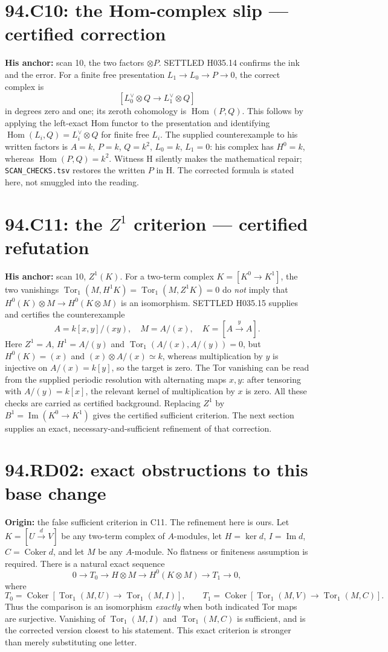 \documentclass[11pt]{article}
\newcommand{\Hom}{\operatorname{Hom}}
\newcommand{\Tor}{\operatorname{Tor}}
\newcommand{\im}{\operatorname{Im}}
\newcommand{\coker}{\operatorname{Coker}}
\begin{document}
\section{94.C10: the Hom-complex slip --- certified correction}
\label{C10}
\textbf{His anchor:} scan 10, the two factors \emph{$\otimes P$}.
SETTLED H035.14 confirms the ink and the error. For a finite free
presentation $L_1\to L_0\to P\to0$, the correct complex is
\[
 [L_0^\vee\otimes Q\longrightarrow L_1^\vee\otimes Q]
\]
in degrees zero and one; its zeroth cohomology is $\Hom(P,Q)$.
This follows by applying the left-exact Hom functor to the presentation
and identifying $\Hom(L_i,Q)=L_i^\vee\otimes Q$ for finite free $L_i$.
The supplied counterexample to his written factors is $A=k$, $P=k$,
$Q=k^2$, $L_0=k$, $L_1=0$: his complex has $H^0=k$, whereas
$\Hom(P,Q)=k^2$. Witness H silently makes the mathematical repair;
\texttt{SCAN\_CHECKS.tsv} restores the written $P$ in H. The corrected formula is
stated here, not smuggled into the reading.

\section{94.C11: the $Z^1$ criterion --- certified refutation}
\label{C11}
\textbf{His anchor:} scan 10, \emph{$Z^1(K)$}.
For a two-term complex $K=[K^0\to K^1]$, the two vanishings
$\Tor_1(M,H^1K)=\Tor_1(M,Z^1K)=0$ do \emph{not} imply that
$H^0(K)\otimes M\to H^0(K\otimes M)$ is an isomorphism.
SETTLED H035.15 supplies and certifies the counterexample
\[
 A=k[x,y]/(xy),\quad M=A/(x),\quad K=[A\xrightarrow{y}A].
\]
Here $Z^1=A$, $H^1=A/(y)$ and
$\Tor_1(A/(x),A/(y))=0$, but $H^0(K)=(x)$ and
$(x)\otimes A/(x)\simeq k$, whereas multiplication by $y$ is
injective on $A/(x)=k[y]$, so the target is zero. The Tor vanishing
can be read from the supplied periodic resolution with alternating
maps $x,y$: after tensoring with $A/(y)=k[x]$, the relevant kernel
of multiplication by $x$ is zero. All these checks are carried as
certified background. Replacing $Z^1$ by $B^1=\im(K^0\to K^1)$
gives the certified sufficient criterion. The next section supplies
an exact, necessary-and-sufficient refinement of that correction.

\section{94.RD02: exact obstructions to this base change}
\label{RD02}
\textbf{Origin:} the false sufficient criterion in C11. The refinement
here is ours. Let $K=[U\xrightarrow d V]$ be any two-term complex of
$A$-modules, let $H=\ker d$, $I=\im d$, $C=\coker d$, and let $M$
be any $A$-module. No flatness or finiteness assumption is required.
There is a natural exact sequence
\[
 0\to T_0\to H\otimes M\longrightarrow H^0(K\otimes M)
 \to T_1\to0,
\]
where
\[
 T_0=\coker[\Tor_1(M,U)\to\Tor_1(M,I)],\qquad
 T_1=\coker[\Tor_1(M,V)\to\Tor_1(M,C)].
\]
Thus the comparison is an isomorphism \emph{exactly} when both
indicated Tor maps are surjective. Vanishing of
$\Tor_1(M,I)$ and $\Tor_1(M,C)$ is sufficient, and is the corrected
version closest to his statement. This exact criterion is stronger
than merely substituting one letter.
\end{document}
